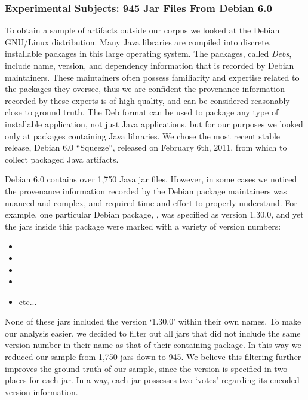 \subsubsection{Experimental Subjects:  945 Jar Files From Debian 6.0}

To obtain a sample of artifacts outside our corpus we looked at the Debian
GNU/Linux distribution.  Many Java libraries are compiled into discrete,
installable packages in this large operating system.  The packages, called
\emph{Debs}, include name, version, and dependency information that is
recorded by Debian maintainers.  These maintainers often possess
familiarity and expertise related to the packages they oversee, thus we are
confident the provenance information recorded by these experts is of high
quality, and can be considered reasonably close to ground truth.  The Deb
format can be used to package any type of installable application, not just
Java applications, but for our purposes we looked only at packages
containing Java libraries.  We chose the most recent stable release, Debian
6.0 ``Squeeze'', released on February 6th, 2011, from which to collect
packaged Java artifacts.

Debian 6.0 contains over 1,750 Java jar files.  However, in some cases we
noticed the provenance information recorded by the Debian package
maintainers was nuanced and complex, and required time and effort to
properly understand.  For example, one particular Debian package,
, was specified as version 1.30.0, and yet
the jars inside this package were marked with a variety of version numbers:

\begin{itemize}

\item {}
\item {}
\item {}
\item {}
\item etc...

\end{itemize}

None of these jars included the version `1.30.0' within their own names.
To make our analysis easier, we decided to filter out all jars that did not
include the same version number in their name as that of their containing
package.  In this way we reduced our sample from 1,750 jars down to 945.
We believe this filtering further improves the ground
truth of our sample, since the version is specified in two places for each
jar.  In a way, each jar possesses two `votes' regarding its encoded
version information.

